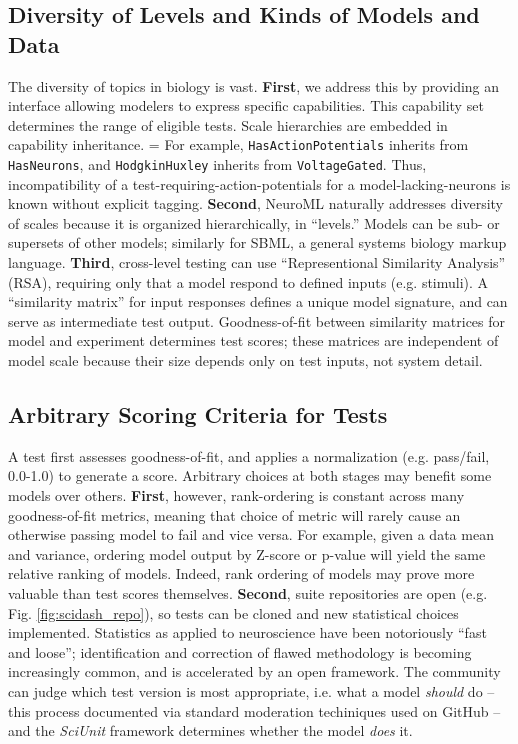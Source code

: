 \documentclass[11pt,letterpaper]{article}
\let\verbx\lstinline
\begin{document}
\subsection{Diversity of Levels and Kinds of Models and Data}
The diversity of topics in biology is vast. 
\textbf{First}, we address this by providing an interface allowing modelers to express specific capabilities.  
This capability set determines the range of eligible tests.  Scale hierarchies are embedded in capability inheritance.  =
For example, \verbx{HasActionPotentials} inherits from \verbx{HasNeurons}, and \verbx{HodgkinHuxley} inherits from \verbx{VoltageGated}. 
Thus, incompatibility of a test-requiring-action-potentials for a model-lacking-neurons is known without explicit tagging. 
\textbf{Second}, NeuroML naturally addresses diversity of scales because it is organized hierarchically, in ``levels.''  
Models can be sub- or supersets of other models; similarly for SBML\cite{sbml_url,hucka_systems_2003}, a general systems biology markup language. 
\textbf{Third}, cross-level testing can use ``Representional Similarity Analysis'' (RSA)\cite{kriegeskorte_representational_2008}, requiring only that a model respond to defined inputs (e.g. stimuli). 
A ``similarity matrix'' for input responses defines a unique model signature, and can serve as intermediate test output. 
Goodness-of-fit between similarity matrices for model and experiment determines test scores; 
these matrices are independent of model scale because their size depends only on test inputs, not system detail.  

\subsection{Arbitrary Scoring Criteria for Tests}
A test first assesses goodness-of-fit, and applies a normalization (e.g. pass/fail, 0.0-1.0) to generate a score. 
Arbitrary choices at both stages may benefit some models over others.  \textbf{First}, however, rank-ordering is constant across many goodness-of-fit metrics, meaning that choice of metric will rarely cause an otherwise passing model to fail and vice versa. 
For example, given a data mean and variance, ordering model output by Z-score or p-value will yield the same relative ranking of models. 
Indeed, rank ordering of models may prove more valuable than test scores themselves. 
\textbf{Second}, suite repositories are open (e.g. Fig. \ref{fig:scidash_repo}), so tests can be cloned and new statistical choices implemented. 
Statistics as applied to neuroscience have been notoriously ``fast and loose''; 
identification and correction of flawed methodology is becoming increasingly common\cite{button_power_2013,kriegeskorte_circular_2009,galbraith_study_2010,fish_fmri_url}, and is accelerated by an open framework. 
The community can judge which test version is most appropriate, i.e. what a model \textit{should} do -- this process documented via standard moderation techiniques used on GitHub -- and the \textit{SciUnit} framework determines whether the model \textit{does} it.  
\end{document}
